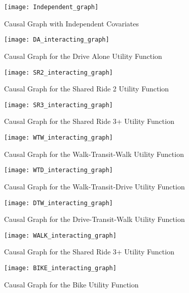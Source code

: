 \begin{figure}
   \centering
   \texttt{[image: Independent\_graph]}
   \caption{Causal Graph with Independent Covariates}
   \label{fig:IND_GRAPH}
\end{figure}

\begin{figure}
   \centering
   \texttt{[image: DA\_interacting\_graph]}
   \caption{Causal Graph for the Drive Alone Utility Function}
   \label{fig:DA_causal_2}
\end{figure}

\begin{figure}
   \centering
   \texttt{[image: SR2\_interacting\_graph]}
   \caption{Causal Graph for the Shared Ride 2 Utility Function}
   \label{fig:SR2_causal_2}
\end{figure}

\begin{figure}
   \centering
   \texttt{[image: SR3\_interacting\_graph]}
   \caption{Causal Graph for the Shared Ride 3+ Utility Function}
   \label{fig:SR3_causal_2}
\end{figure}

\begin{figure}
   \centering
   \texttt{[image: WTW\_interacting\_graph]}
   \caption{Causal Graph for the Walk-Transit-Walk Utility Function}
   \label{fig:WTW_causal_2}
\end{figure}

\begin{figure}
   \centering
   \texttt{[image: WTD\_interacting\_graph]}
   \caption{Causal Graph for the Walk-Transit-Drive Utility Function}
   \label{fig:WTD_causal_2}
\end{figure}

\begin{figure}
   \centering
   \texttt{[image: DTW\_interacting\_graph]}
   \caption{Causal Graph for the Drive-Transit-Walk Utility Function}
   \label{fig:DTW_causal_2}
\end{figure}

\begin{figure}
   \centering
   \texttt{[image: WALK\_interacting\_graph]}
   \caption{Causal Graph for the Shared Ride 3+ Utility Function}
   \label{fig:WALK_causal_2}
\end{figure}

\begin{figure}
   \centering
   \texttt{[image: BIKE\_interacting\_graph]}
   \caption{Causal Graph for the Bike Utility Function}
   \label{fig:BIKE_causal_2}
\end{figure}

